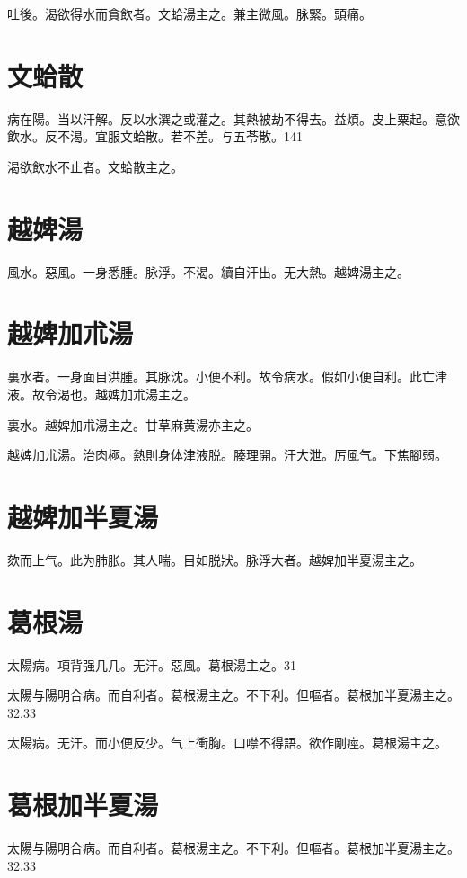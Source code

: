 \documentclass[b5paper,twoside,zihao=-4,UTF8]{ctexbook}
\begin{document}
吐後。渴欲得水而貪飲者。文蛤湯主之。兼主微風。脉緊。頭痛。

\section{文蛤散}

病在陽。当以汗解。反以水潠之或灌之。其熱被劫不得去。益煩。皮上粟起。意欲飲水。反不渴。宜服文蛤散。若不差。与五苓散。141

渴欲飲水不止者。文蛤散主之。

\section{越婢湯}

風水。惡風。一身悉腫。脉浮。不渴。續自汗出。无大熱。越婢湯主之。

\section{越婢加朮湯}

裏水者。一身面目洪腫。其脉沈。小便不利。故令病水。假如小便自利。此亡津液。故令渴也。越婢加朮湯主之。

裏水。越婢加朮湯主之。甘草麻黄湯亦主之。

越婢加朮湯。治肉極。熱則身体津{液}脱。腠理開。汗大泄。厉風气。下焦腳弱。

\section{越婢加半夏湯}

欬而上气。此为肺胀。其人喘。目如脱狀。脉浮大者。越婢加半夏湯主之。

\section{葛根湯}

太陽病。項背强几几。无汗。惡風。葛根湯主之。31

太陽与陽明合病。而自利{者}。葛根湯主之。不下利。但嘔者。葛根加半夏湯主之。32.33

太陽病。无汗。而小便反少。气上衝胸。口噤不得語。欲作剛痙。葛根湯主之。

\section{葛根加半夏湯}

太陽与陽明合病。而自利{者}。葛根湯主之。不下利。但嘔者。葛根加半夏湯主之。32.33
\end{document}
